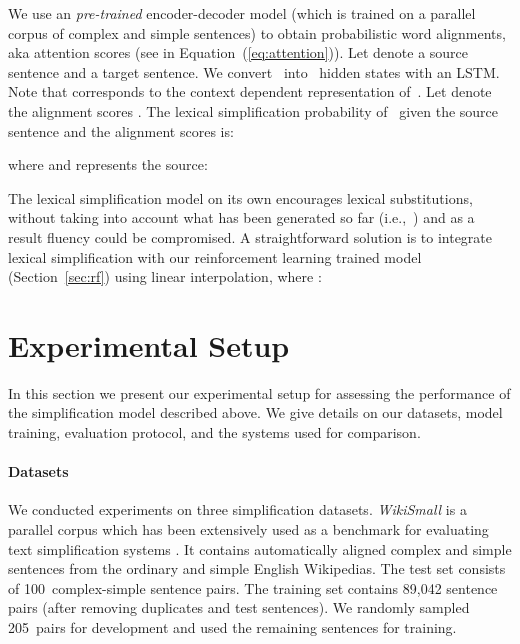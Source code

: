 \documentclass[11pt,letterpaper]{article}
\begin{document}
We use an {\it pre-trained} encoder-decoder model (which is trained on a parallel corpus of
complex and simple sentences) to obtain probabilistic word alignments,
aka attention scores (see  in
Equation~(\ref{eq:attention})).  Let 
denote a source sentence and  a target
sentence. We convert~ into~ hidden states
 with an
LSTM. Note that \mbox{}
corresponds to the context dependent representation of~. Let
 denote the alignment scores
. The lexical
simplification probability of~ given the source sentence and the
alignment scores is:

where  and 
represents the source:


The lexical simplification model on its own encourages lexical
substitutions, without taking into account what has been generated so
far (i.e.,~) and as a result fluency could be
compromised. A straightforward solution is to integrate lexical
simplification with our reinforcement learning trained model
(Section~\ref{sec:rf}) using linear interpolation, where
:



\section{Experimental Setup}
\label{sec:experimental-setup}

In this section we present our experimental setup for assessing the
performance of the simplification model described above. We give
details on our datasets, model training,  evaluation
protocol, and the systems used for comparison. 







\paragraph{Datasets}
\label{sec:dataset}

We conducted experiments on three simplification datasets.
\textit{WikiSmall} \cite{zhu2010monolingual} is a parallel corpus
which has been extensively used as a benchmark for evaluating text
simplification systems
\cite{wubben2012sentence,woodsend-lapata:2011:EMNLP,narayan-gardent:2014,zhu2010monolingual}. It
contains automatically aligned complex and simple sentences from the
ordinary and simple English Wikipedias. The test set consists of
100~complex-simple sentence pairs. The training set contains 89,042
sentence pairs (after removing duplicates and test sentences).  We
randomly sampled 205~pairs for development and used the
remaining sentences for training.  
\end{document}
